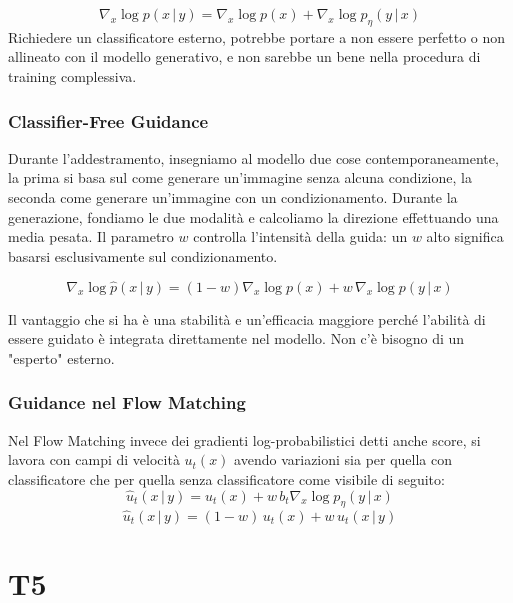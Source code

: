 \begin{equation}
    \nabla_x\log p(x\,|\,y) = \nabla_x\log p(x) + \nabla_x \log p_\eta (y\,|\,x)
\end{equation}
Richiedere un classificatore esterno, potrebbe portare a non essere perfetto o non allineato con il modello generativo, e non sarebbe un bene nella procedura di training complessiva.

\subsubsection{Classifier-Free Guidance}

Durante l'addestramento, insegniamo al modello due cose contemporaneamente, la prima si basa sul come generare un'immagine senza alcuna condizione, la seconda come generare un'immagine con un condizionamento. Durante la generazione, fondiamo le due modalità e calcoliamo la direzione effettuando una media pesata. Il parametro $w$ controlla l'intensità della guida: un $w$ alto significa basarsi esclusivamente sul condizionamento.

\begin{equation}
    \nabla_x\log \hat{p}(x\,|\,y) = (1 - w)\nabla_x\log p(x) + w\,\nabla_x \log p (y\,|\,x)
\end{equation}

Il vantaggio che si ha è una stabilità e un'efficacia maggiore perché l'abilità di essere guidato è integrata direttamente nel modello. Non c'è bisogno di un "esperto" esterno.

\subsubsection{Guidance nel Flow Matching}
Nel Flow Matching invece dei gradienti log-probabilistici detti anche score, si lavora con campi di velocità $u_t(x)$ avendo variazioni sia per quella con classificatore che per quella senza classificatore come visibile di seguito:
\begin{equation*}
    \hat{u}_t(x\,|\,y) = u_t(x) + w\,b_t\nabla_x \log p_\eta(y\,|\,x)
\end{equation*}
\begin{equation*}
    \hat{u}_t(x\,|\,y) =(1-w)\,u_t(x) + w\,u_t(x\,|\,y)
\end{equation*}

\section{T5}

